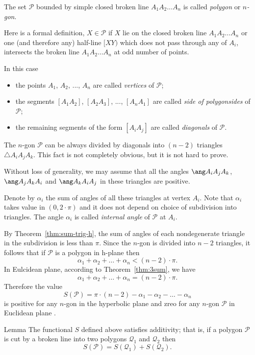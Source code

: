 {The set $\mathcal{P}$ bounded by simple closed broken line $A_1A_2\dots A_n$ is called
\emph{polygon} or \emph{$n$-gon}.

Here is a formal definition, $X\in\mathcal{P}$ if $X$ lie on the closed broken line $A_1A_2\dots A_n$ or one (and therefore any) half-line $[XY)$ which does not pass through any of $A_i$, intersects the broken line $A_1A_2\dots A_n$ at odd number of points.

In this case
\begin{itemize}
\item the points $A_1$, $A_2$, ..., $A_n$ are called \emph{vertices} of $\mathcal{P}$;
\item the segments $[A_1A_2]$, $[A_2A_3]$, ..., $[A_{n}A_1]$ 
are called 
\emph{side of polygon}\emph{sides} of $\mathcal{P}$;
\item the remaining segments of the form $[A_iA_j]$ are called  
\emph{diagonals} of $\mathcal{P}$.
\end{itemize}

The  $n$-gon $\mathcal{P}$ can be always divided by diagonals into $(n-2)$ triangles $\triangle A_iA_jA_k$.
This fact is not completely obvious, but it is not hard to prove.

Without loss of generality, we may assume that all the angles $\ang A_iA_jA_k$,
$\ang A_jA_kA_i$ and $\ang A_kA_iA_j$ in these triangles are positive.

Denote by $\alpha_i$ the sum of angles of all these triangles at vertex $A_i$.
Note that $\alpha_i$ takes value in $(0,2\cdot\pi)$ and it does not depend on choice of subdivision into triangles.
The angle $\alpha_i$ is called 
\emph{internal angle} of $\mathcal{P}$ at $A_i$.

By Theorem~\ref{thm:sum-trig-h}, the sum of angles of each nondegenerate triangle in the subdivision is less than $\pi$.
Since the $n$-gon is divided into $n-2$ triangles, 
it follows that if $\mathcal{P}$ is a polygon in h-plane then
$$\alpha_1+\alpha_2+\dots+\alpha_n< (n-2)\cdot\pi.$$
In Eulcidean plane, according to Theorem~\ref{thm:3sum}, we have 
$$\alpha_1+\alpha_2+\dots+\alpha_n=(n-2)\cdot\pi.$$
Therefore the value
$$S(\mathcal{P})=\pi\cdot(n-2)-\alpha_1-\alpha_2-\dots-\alpha_n$$
is positive for any $n$-gon in the hyperbolic plane and zreo for any $n$-gon $\mathcal{P}$ in Euclidean plane .

\begin{thm}{Lemma}\label{lem:n-sum-angle}
The functional $S$ defined above satisfies additivity; 
that is, if a polygon $\mathcal{P}$ is cut by a broken line into two polygons 
$\mathcal{Q}_1$ and $\mathcal{Q}_2$ then
$$S(\mathcal{P})=
S(\mathcal{Q}_1)+S(\mathcal{Q}_2).$$


\end{thm}}
